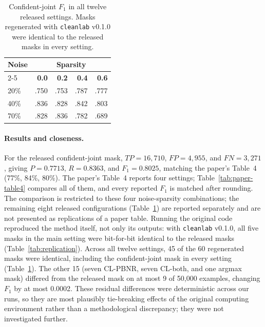 \documentclass[11pt]{article}
\newcommand{\cleanlab}{\texttt{cleanlab}}
\begin{document}
\begin{table}[t]
\centering
\small
\setlength{\tabcolsep}{5pt}
\begin{tabular}{lrrrr}
\toprule
\textbf{Noise} & \multicolumn{4}{c}{\textbf{Sparsity}} \\
\cmidrule(l){2-5}
 & \textbf{0.0} & \textbf{0.2} & \textbf{0.4} & \textbf{0.6} \\
\midrule
20\% & .750 & .753 & .787 & .777 \\
40\% & .836 & .828 & .842 & .803 \\
70\% & .828 & .836 & .782 & .689 \\
\bottomrule
\end{tabular}
\caption{Confident-joint $F_1$ in all twelve released settings. Masks
regenerated with \cleanlab{} v0.1.0 were identical to the released masks in
every setting.}
\label{tab:replication-grid}
\end{table}

\paragraph{Results and closeness.} For the released confident-joint mask,
$TP=16{,}710$, $FP=4{,}955$, and $FN=3{,}271$, giving $P=0.7713$,
$R=0.8363$, and $F_1=0.8025$, matching the paper's Table~4 (77\%, 84\%,
80\%). The paper's Table~4 reports four settings; Table~\ref{tab:paper-table4}
compares all of them, and every reported $F_1$ is matched after rounding.
The comparison is restricted to these four noise-sparsity combinations; the
remaining eight released configurations (Table~\ref{tab:replication-grid})
are reported separately and are not presented as replications of a paper
table. Running the
original code reproduced the method itself, not only its outputs: with
\cleanlab{} v0.1.0, all five masks in the main setting were bit-for-bit
identical to the released masks (Table~\ref{tab:replication}). Across all
twelve settings, 45 of the 60 regenerated masks were identical, including the
confident-joint mask in every setting (Table~\ref{tab:replication-grid}). The
other 15 (seven CL-PBNR, seven CL-both, and one argmax mask)
differed from the released mask on at most 9 of 50,000 examples, changing
$F_1$ by at most 0.0002. These residual differences were deterministic across
our runs, so they are most plausibly tie-breaking effects of the original
computing environment rather than a methodological discrepancy; they were not
investigated further.
\end{document}
